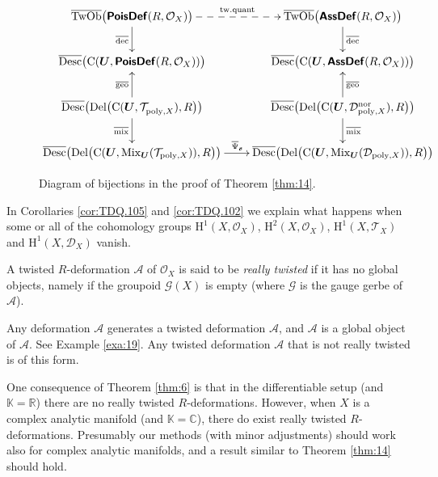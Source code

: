 \documentclass[a4paper, 10pt]{amsart}
\theoremstyle{definition}
\numberwithin{equation}{section}
\newcommand{\opn}{\operatorname}
\newcommand{\cat}[1]{\operatorname{\mathsf{#1}}}
\newcommand{\ol}{\overline}
\newcommand{\mcal}[1]{\mathcal{#1}}
\newcommand{\mrm}[1]{\mathrm{#1}}
\newcommand{\mbb}[1]{\mathbb{#1}}
\newcommand{\bsym}[1]{\boldsymbol{#1}}
\newcommand{\K}{\mbb{K}}
\newcommand{\gerbe}[1]{\bsym{\mcal{#1}}}
\newcommand{\twocat}[1]{\operatorname{\bsym{\cat{#1}}}}
\begin{document}
\begin{figure}
\[ \UseTips \xymatrix @C=5ex @R=5ex {
\ol{\opn{TwOb}} \bigl( \twocat{PoisDef}(R, \mcal{O}_X) \bigr)
\ar[d]_{\ol{\opn{dec}}}
\ar@{-->}[r]^{\opn{tw{.}quant}}
&
\ol{\opn{TwOb}} \bigl( \twocat{AssDef}(R, \mcal{O}_X) \bigr)
\ar[d]^{\ol{\opn{dec}}}
\\
\ol{\opn{Desc}} \bigl( 
\mrm{C}( \bsym{U}, \twocat{PoisDef}(R, \mcal{O}_X) ) \bigr)
&
\ol{\opn{Desc}} \bigl( 
\mrm{C}( \bsym{U}, \twocat{AssDef}(R, \mcal{O}_X) ) \bigr)
\\
\ol{\opn{Desc}}  \bigl( \opn{Del}
\bigl( \mrm{C}(\bsym{U}, \mcal{T}^{}_{\mrm{poly}, X}), R \bigr) \bigr)
\ar[u]^{\ol{\opn{geo}}}
\ar[d]_{\ol{\opn{mix}}}
&
\ol{\opn{Desc}} \bigl( \opn{Del} \bigr(
\mrm{C}(\bsym{U}, \mcal{D}^{\mrm{nor}}_{\mrm{poly}, X}) , R \bigr) \bigr)
\ar[u]_{\ol{\opn{geo}}}
\ar[d]^{\ol{\opn{mix}}}
\\
\ol{\opn{Desc}} \bigl( \opn{Del} \bigl(
\mrm{C}(\bsym{U}, \opn{Mix}_{\bsym{U}}(\mcal{T}_{\mrm{poly},X}) ), R \bigr)
\bigr)
\ar[r]^{\ol{\Psi}_{\bsym{s}}}
& 
\ol{\opn{Desc}} \bigl( \opn{Del} \bigl(
\mrm{C}(\bsym{U}, \opn{Mix}_{\bsym{U}}(\mcal{D}_{\mrm{poly}, X}) ), R \bigr)
\bigr)
} \]
\caption{Diagram of bijections in the proof of Theorem \ref{thm:14}.}
\label{fig:diagram}
\end{figure}

In Corollaries \ref{cor:TDQ.105} and \ref{cor:TDQ.102} we explain what happens
when some or all of the cohomology groups
$\mrm{H}^1(X, \mcal{O}_X)$, $\mrm{H}^2(X, \mcal{O}_X)$, 
$\mrm{H}^1(X, \mcal{T}_X)$ and $\mrm{H}^1(X, \mcal{D}_X)$
vanish.

A twisted $R$-deformation $\gerbe{A}$ of $\mcal{O}_X$ is said to be {\em really
twisted} if it has no global objects, namely if the groupoid $\gerbe{G}(X)$ is
empty (where $\gerbe{G}$ is the gauge gerbe of  $\gerbe{A}$).

Any deformation $\mcal{A}$ generates a twisted
deformation $\gerbe{A}$, and $\mcal{A}$ is a global object of
$\gerbe{A}$. See Example \ref{exa:19}. Any twisted deformation $\gerbe{A}$
that is not really twisted is of this form.

One consequence of Theorem \ref{thm:6} is that in the differentiable
setup (and $\K = \mbb{R}$) there are no really twisted
$R$-deformations. 
However, when $X$ is a complex analytic manifold (and $\K = \mbb{C}$),
there do exist really twisted $R$-deformations. Presumably our methods
(with minor adjustments) should work also for complex analytic
manifolds, and a result similar to Theorem \ref{thm:14} should hold.
\end{document}
